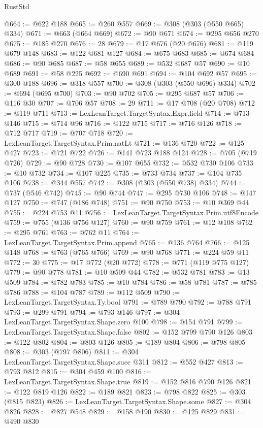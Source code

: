 \begin{lexlean}{RustStd}
\begin{coremodule}
{\begin{coremodule}
{{{{{{{{{{{{{{{{{{{{{{{{{{{{{{{{{{{{{{{{{{{{{{{{{{{{{{{{{{{{{{{{{{{{@664 := @622 @188
@665 := @260 @557
@669 := @308 (@303 (@550 @665) @334)
@671 := @663 (@664 @669)
@672 := @90 @671
@674 := @295 @656 @270
@675 := @185 @270
@676 := 28
@679 := @17 @676 (@20 @676)
@681 := @119 @679 @148
@683 := @122 @681 @127
@684 := @675 @683
@685 := @674 @684
@686 := @90 @685
@687 := @58 @655
@689 := @532 @687 @57
@690 := @10 @689
@691 := @58 @225
@692 := @690 @691
@694 := @104 @692 @57
@695 := @300 @188
@696 := @318 @557
@700 := @308 (@303 (@550 @696) @334)
@702 := @694 (@695 @700)
@703 := @90 @702
@705 := @295 @687 @57
@706 := @116 @30
@707 := @706 @57
@708 := 29
@711 := @17 @708 (@20 @708)
@712 := @119 @711
@713 := LexLeanTarget.TargetSyntax.Expr.field
@714 := @713 @146
@715 := @714 @96
@716 := @122 @715
@717 := @716 @126
@718 := @712 @717
@719 := @707 @718
@720 := LexLeanTarget.TargetSyntax.Prim.natLt
@721 := @136 @720
@722 := @125 @427
@723 := @721 @722
@726 := @141 @723 @188 @124
@728 := @705 (@719 @726)
@729 := @90 @728
@730 := @107 @655
@732 := @532 @730 @106
@733 := @10 @732
@734 := @107 @225
@735 := @733 @734
@737 := @104 @735 @106
@738 := @344 @557
@742 := @308 (@303 (@550 @738) @334)
@744 := @737 (@546 @742)
@745 := @90 @744
@747 := @295 @730 @106
@748 := @147 @127
@750 := @747 (@186 @748)
@751 := @90 @750
@753 := @10 @369 @44
@755 := @224 @753 @11
@756 := LexLeanTarget.TargetSyntax.Prim.utf8Encode
@759 := @755 (@136 @756 @127)
@760 := @90 @759
@761 := @12 @108
@762 := @295 @761
@763 := @762 @11
@764 := LexLeanTarget.TargetSyntax.Prim.append
@765 := @136 @764
@766 := @125 @148
@768 := @763 (@765 @766)
@769 := @90 @768
@771 := @224 @59 @11
@772 := 30
@775 := @17 @772 (@20 @772)
@778 := @771 (@119 @775 @127)
@779 := @90 @778
@781 := @10 @509 @44
@782 := @532 @781
@783 := @13 @509
@784 := @782 @783
@785 := @10 @784
@786 := @58 @781
@787 := @785 @786
@788 := @104 @787
@789 := @112 @509
@790 := LexLeanTarget.TargetSyntax.Ty.bool
@791 := @789 @790
@792 := @788 @791
@793 := @299 @791
@794 := @793 @146
@797 := @304 LexLeanTarget.TargetSyntax.Shape.zero @100
@798 := @154 @791
@799 := LexLeanTarget.TargetSyntax.Shape.false
@802 := @152 @799 @790 @126
@803 := @122 @802
@804 := @803 @126
@805 := @189 @804
@806 := @798 @805
@808 := @303 (@797 @806)
@811 := @304 LexLeanTarget.TargetSyntax.Shape.succ @311
@812 := @552 @427
@813 := @793 @812
@815 := @304 @459 @100
@816 := LexLeanTarget.TargetSyntax.Shape.true
@819 := @152 @816 @790 @126
@821 := @122 @819 @126
@822 := @189 @821
@823 := @798 @822
@825 := @303 (@815 @823)
@826 := LexLeanTarget.TargetSyntax.Shape.some
@827 := @304 @826
@828 := @827 @548
@829 := @158 @190
@830 := @125 @829
@831 := @490 @830
}}}}}}}}}}}}}}}}}}}}}}}}}}}}}}}}}}}}}}}}}}}}}}}}}}}}}}}}}}}}}}}}}}}}
\end{coremodule}}
\end{coremodule}
\end{lexlean}
